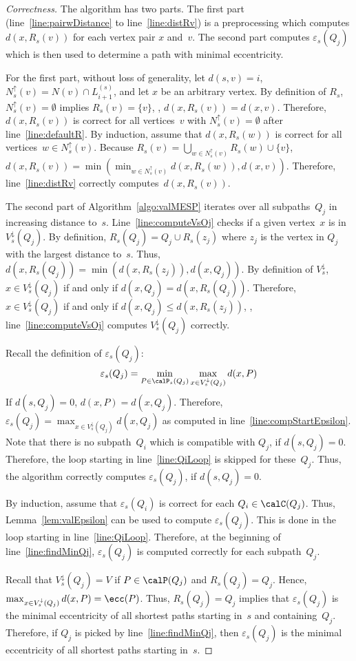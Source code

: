 \begin{proof}
    [Correctness]
The algorithm has two parts.
The first part (line~\ref{line:pairwDistance} to line~\ref{line:distRv}) is a preprocessing which computes $d(x, R_s(v))$ for each vertex pair $x$ and~$v$.
The second part computes $\varepsilon_s(Q_j)$ which is then used to determine a path with minimal eccentricity.

For the first part, without loss of generality, let $d(s, v) = i$, $N^\uparrow_s(v) = N(v) \cap L_{i+1}^{(s)}$, and let $x$ be an arbitrary vertex.
By definition of $R_s$, $N^\uparrow_s(v) = \emptyset$ implies $R_s(v) = \{ v \}$, \ie, $d(x, R_s(v)) = d(x, v)$.
Therefore, $d(x, R_s(v))$ is correct for all vertices~$v$ with $N^\uparrow_s(v) = \emptyset$ after line~\ref{line:defaultR}.
By induction, assume that $d(x, R_s(w))$ is correct for all vertices~$w \in N^\uparrow_s(v)$.
Because $R_s(v) = \bigcup_{w \in N^\uparrow_s(v)} R_s(w) \cup \{ v \}$, $d(x, R_s(v)) = \min(\min_{w \in N^\uparrow_s(v)} d(x, R_s(w)), d(x, v))$.
Therefore, line~\ref{line:distRv} correctly computes~$d(x, R_s(v))$.

The second part of Algorithm~\ref{algo:valMESP} iterates over all subpaths~$Q_j$ in increasing distance to~$s$.
Line~\ref{line:computeVsOj} checks if a given vertex~$x$ is in $V^\downarrow_s(Q_j)$.
By definition, $R_s(Q_j) = Q_j \cup R_s(z_j)$ where $z_j$ is the vertex in $Q_j$ with the largest distance to~$s$.
Thus, $d(x, R_s(Q_j)) = \min( d(x, R_s(z_j)), d(x, Q_j))$.
By definition of $V^\downarrow_s$, $x \in V^\downarrow_s(Q_j)$ if and only if $d(x, Q_j) = d(x, R_s(Q_j))$.
Therefore, $x \in V^\downarrow_s(Q_j)$ if and only if $d(x, Q_j) \leq d(x, R_s(z_j))$, \ie, line~\ref{line:computeVsOj} computes $V^\downarrow_s(Q_j)$ correctly.

Recall the definition of $\varepsilon_s(Q_j)$:
\[
    \varepsilon_s(Q_j) = \min_{P \in \calP_s(Q_j)} \max_{x \in V^\downarrow_s(Q_j)} d(x, P)
\]
If $d(s, Q_j) = 0$, $d(x, P) = d(x, Q_j)$.
Therefore, $\varepsilon_s(Q_j) = \max_{x \in V^\downarrow_s(Q_j)} d(x, Q_j)$ as computed in line~\ref{line:compStartEpsilon}.
Note that there is no subpath~$Q_i$ which is compatible with $Q_j$, if $d(s, Q_j) = 0$.
Therefore, the loop starting in line~\ref{line:QiLoop} is skipped for these~$Q_j$.
Thus, the algorithm correctly computes $\varepsilon_s(Q_j)$, if $d(s, Q_j) = 0$.

By induction, assume that $\varepsilon_s(Q_i)$ is correct for each $Q_i \in \calC(Q_j)$.
Thus, Lemma~\ref{lem:valEpsilon} can be used to compute $\varepsilon_s(Q_j)$.
This is done in the loop starting in line~\ref{line:QiLoop}.
Therefore, at the beginning of line~\ref{line:findMinQj}, $\varepsilon_s(Q_j)$ is computed correctly for each subpath~$Q_j$.

Recall that $V^\downarrow_s(Q_j) = V$ if $P \in \calP(Q_j)$ and $R_s(Q_j) = Q_j$. Hence, $\max_{x \in V^\downarrow_s(Q_j)} d(x, P) = \ecc(P)$.
Thus, $R_s(Q_j) = Q_j$ implies that $\varepsilon_s(Q_j)$ is the minimal eccentricity of all shortest paths starting in~$s$ and containing~$Q_j$.
Therefore, if $Q_j$ is picked by line~\ref{line:findMinQj}, then $\varepsilon_s(Q_j)$ is the minimal eccentricity of all shortest paths starting in~$s$.
\end{proof}

